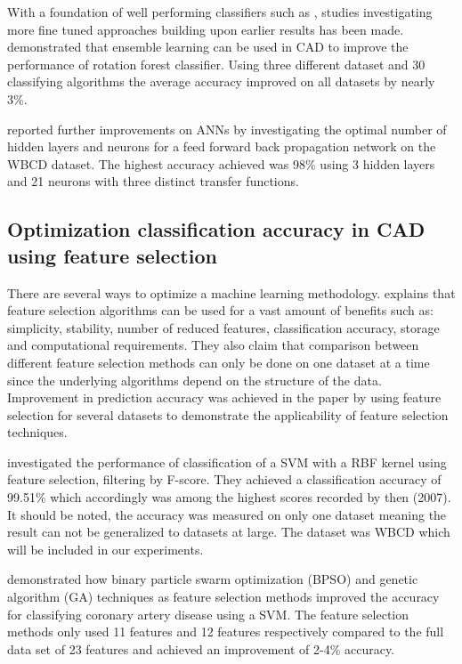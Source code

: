 With a foundation of well performing classifiers such as \parencite{ramos2012}, studies investigating more fine tuned approaches building upon earlier results has been made. \textcite{akin2011} demonstrated that ensemble learning can be used in CAD to improve the performance of rotation forest classifier. Using three different dataset and 30 classifying algorithms the average accuracy improved on all datasets by nearly 3\%.

\textcite{Abdel-Ilah2017} reported further improvements on ANNs by investigating the optimal number of hidden layers and neurons for a feed forward back propagation network on the WBCD dataset. The highest accuracy achieved was 98\% using 3 hidden layers and 21 neurons with three distinct transfer functions.

\subsection{Optimization classification accuracy in CAD using feature selection}


There are several ways to optimize a machine learning methodology. \textcite{c201416} explains that feature selection algorithms can be used for a vast amount of benefits such as: simplicity, stability, number of reduced features, classification accuracy, storage and computational requirements. They also claim that comparison between different feature selection methods can only be done on one dataset at a time since the underlying algorithms depend on the structure of the data. Improvement in prediction accuracy was achieved in the paper by using feature selection for several datasets to demonstrate the applicability of feature selection techniques.

\textcite{akay2009} investigated the performance of classification of a SVM with a RBF kernel using feature selection, filtering by F-score. They achieved a classification accuracy of 99.51\% which accordingly was among the highest scores recorded by then (2007). It should be noted, the accuracy was measured on only one dataset meaning the result can not be generalized to datasets at large. The dataset was WBCD which will be included in our experiments.

\textcite{b20103177} demonstrated how  binary particle swarm optimization (BPSO) and genetic algorithm (GA) techniques as feature selection methods improved the accuracy for classifying coronary artery disease using a SVM. The feature selection methods only used 11 features and 12 features respectively compared to the full data set of 23 features and achieved an improvement of 2-4\% accuracy.

